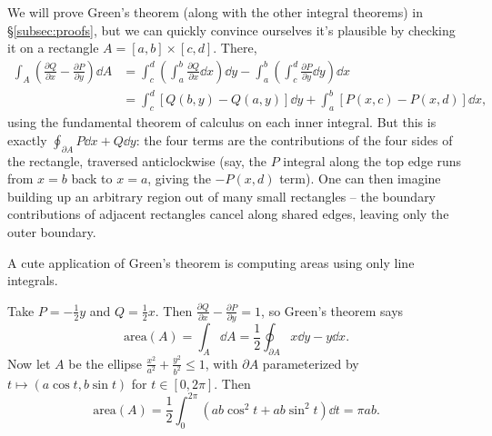 \begin{center}
\end{center}

We will prove Green's theorem (along with the other integral theorems) in \S\ref{subsec:proofs}, but we can quickly convince ourselves it's plausible by checking it on a rectangle $A = [a, b] \times [c, d]$. There,
\begin{align*}
	\int_A \left(\frac{\partial Q}{\partial x} - \frac{\partial P}{\partial y}\right) \dd A
	&= \int_c^d \left(\int_a^b \frac{\partial Q}{\partial x} \dd x \right) \dd y - \int_a^b \left(\int_c^d \frac{\partial P}{\partial y} \dd y\right) \dd x \\
	&= \int_c^d \left[Q(b, y) - Q(a, y)\right] \dd y + \int_a^b \left[P(x, c) - P(x, d)\right] \dd x,
\end{align*}
using the fundamental theorem of calculus on each inner integral. But this is exactly $\oint_{\partial A} P \dd x + Q \dd y$: the four terms are the contributions of the four sides of the rectangle, traversed anticlockwise (say, the $P$ integral along the top edge runs from $x = b$ back to $x = a$, giving the $-P(x, d)$ term). One can then imagine building up an arbitrary region out of many small rectangles -- the boundary contributions of adjacent rectangles cancel along shared edges, leaving only the outer boundary.

A cute application of Green's theorem is computing areas using only line integrals.

\begin{example}
	Take $P = -\frac{1}{2} y$ and $Q = \frac{1}{2}x$. Then $\frac{\partial Q}{\partial x} - \frac{\partial P}{\partial y} = 1$, so Green's theorem says
	$$
	\text{area}(A) = \int_A \dd A = \frac{1}{2}\oint_{\partial A} x \dd y - y \dd x.
	$$
	Now let $A$ be the ellipse $\frac{x^2}{a^2} + \frac{y^2}{b^2} \leq 1$, with $\partial A$ parameterized by $t \mapsto (a \cos t, b \sin t)$ for $t \in [0, 2\pi]$. Then
	$$
	\text{area}(A) = \frac{1}{2}\int_0^{2 \pi} \left(a b\cos^2 t + ab \sin^2 t \right) \dd t = \pi a b.
	$$
\end{example}


